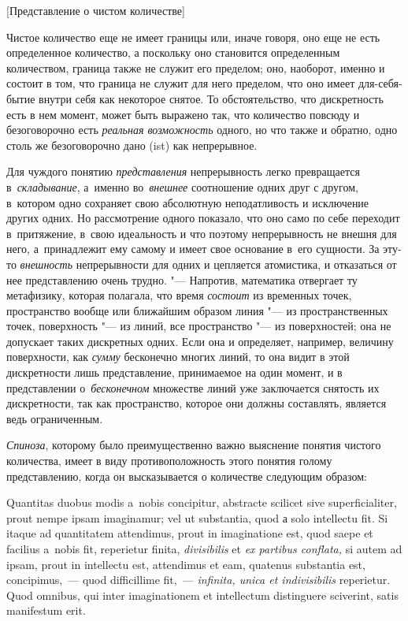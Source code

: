 %
{[Представление о чистом количестве]}

Чистое количество еще не имеет границы или, иначе говоря, оно еще не есть
определенное количество, а поскольку оно становится определенным
количеством, граница также не служит его пределом; оно, наоборот, именно и
состоит в том, что граница не служит для него пределом, что оно имеет
для-себя-бытие внутри себя как некоторое снятое. То обстоятельство, что
дискретность есть в нем момент, может быть выражено так, что количество
повсюду и безоговорочно есть {\em реальная возможность} одного, но
что также и обратно, одно столь же безоговорочно дано (ist) как непрерывное.

Для чуждого понятию {\em представления} непрерывность легко превращается
в~{\em складывание}, а~именно во~{\em внешнее} соотношение одних друг с другом,
в~котором одно сохраняет свою абсолютную неподатливость и исключение других
одних. Но рассмотрение одного показало, что оно само по себе переходит
в~притяжение, в~свою идеальность и что поэтому непрерывность не внешня для
него, а~принадлежит ему самому и имеет свое основание в~его сущности. За эту-то
{\em внешность} непрерывности для одних и цепляется атомистика, и отказаться от
нее представлению очень трудно. "--- Напротив, математика отвергает ту
метафизику, которая полагала, что время {\em состоит} из временных точек,
пространство вообще или ближайшим образом линия "--- из пространственных точек,
поверхность "--- из линий, все пространство "--- из поверхностей; она не
допускает таких дискретных одних. Если она и определяет, например, величину
поверхности, как {\em сумму} бесконечно многих линий, то она видит в этой
дискретности лишь представление, принимаемое на один момент, и в представлении
о~{\em бесконечном} множестве линий уже заключается снятость их дискретности,
так как пространство, которое они должны составлять, является ведь
ограниченным.

{\em Спиноза}, которому было преимущественно важно выяснение понятия чистого
количества, имеет в виду противоположность этого понятия голому представлению,
когда он высказывается о количестве следующим образом:

\vspace{3mm}

\begin{footnotesize}\fontsize{10}{11}\selectfont
Quantitas duobus modis a~nobis conci\-pitur, abs\-trac\-te scili\-cet
sive super\-fi\-ci\-ali\-ter, prout nempe ipsam ima\-gina\-mur; vel ut
sub\-stan\-tia, quod а solo intel\-lectu fit. Si itaque ad quanti\-tatem
atten\-di\-mus, prout in imagin\-ati\-one est, quod saepe et faci\-lius
a~nobis fit, repe\-rietur finita, {\em divi\-sibi\-lis} et
{\em ex parti\-bus con\-flata,} si autem ad ipsam, prout in intel\-lectu est,
atten\-di\-mus et eam, quate\-nus sub\-stan\-tia est, con\-cipi\-mus,~--- quod
dif\-ficil\-lime fit,~--- {\em infi\-nita, unica et indi\-vi\-si\-bi\-lis}
re\-pe\-rietur. Quod omni\-bus, qui inter ima\-gi\-na\-tio\-nem et
intel\-lectum dis\-tin\-guere scive\-rint, satis mani\-fes\-tum erit.\par
\end{footnotesize}

